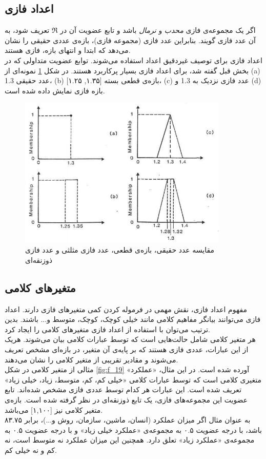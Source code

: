  \subsection{‌اعداد فازی} 
 اگر یک مجموعه‌ی فازی \textit{محدب} و \textit{نرمال} باشد و تابع عضویت آن در 
 $\Re$
 تعریف شود، به آن عدد فازی گویند. بنابراین عدد فازی (مجموعه فازی)، بازه‌ی عددی حقیقی را نشان می‌دهد که ابتدا و انتهای بازه، فازی هستند.
 \cite{Lee2005}\\
 اعداد فازی برای توصیف غیردقیق اعداد استفاده می‌شوند. توابع عضویت متداولی که در بخش قبل گفته شد، برای اعداد فازی بسیار پرکاربرد هستند. در شکل 
 \ref{fig:f_21}
 نمونه‌ای از (a) عدد حقیقی 1.3، (b) بازه‌ی قطعی بسته [۱.۳۵, ۱.۲۵]، (c) عدد فازی نزدیک به  1.3 و (d) بازه فازی نمایش داده شده است. 
 \cite{Klir1995}
   	\begin{figure}[!hbtp]
 	\centering 
 	\includegraphics[width=100mm]{Images/Fig21.png}
 	\vspace{-0.5cm}
 	\caption{مقایسه عدد حقیقی، بازه‌ی قطعی، عدد فازی مثلثی و عدد فازی ذوزنقه‌ای}\label{fig:f_21}
 \end{figure}
  \subsection{‌متغیرهای کلامی}
  مفهوم اعداد فازی، نقش مهمی در فرموله کردن کمی متغیرهای فازی دارند. اعداد فازی می‌توانند بیانگر مفاهیم کلامی مانند خیلی کوچک، کوچک، متوسط و... باشند. بدین ترتیب می‌توان با استفاده از اعداد فازی متغیرهای کلامی
   را ایجاد کرد. \\
   هر متغیر کلامی شامل حالت‌هایی است که توسط عبارات کلامی
   بیان می‌شوند. هریک از این عبارات، عددی فازی هستند که بر پایه‌ی آن متغیر، در بازه‌ای مشخص تعریف می‌شوند و مقادیر تقریبی از متغیر کلامی را نشان می‌دهند. \\
   مثالی از متغیر کلامی در شکل
   \ref{fig:f_19}
   آورده شده است. در این مثال، «عملکرد»
   متغیری کلامی است که توسط عبارات کلامی «خیلی کم، کم، متوسط، زیاد، خیلی زیاد» تعریف شده است. این عبارات هر کدام توسط عددی فازی مشخص شده‌اند. تابع عضویت این مجموعه‌های فازی، یک تابع ذوزنقه‌ای در نظر گرفته شده است. بازه‌ی متغیر کلامی نیز [۱,۱۰۰] می‌باشد. 
     \cite{Klir1995}
   \\
   به عنوان مثال اگر میزان عملکرد (انسان، ماشین، سازمان، روش و...)، برابر ۸۳.۷۵ باشد، با درجه عضویت ۰.۵ به مجموعه‌ی «عملکرد خیلی زیاد» و با درجه‌ عضویت ۰.۵ به مجموعه‌ی «عملکرد زیاد» تعلق دارد. همچنین این میزان عملکرد نه متوسط است، نه کم و نه خیلی کم. 

